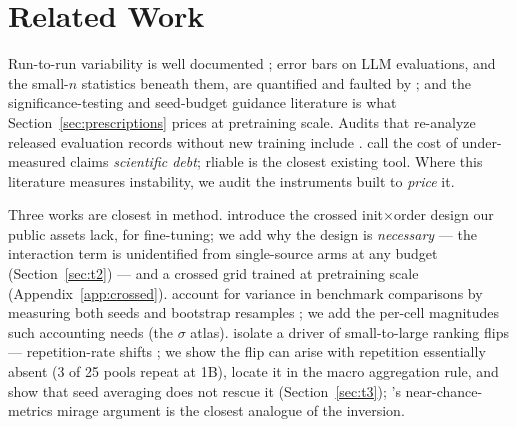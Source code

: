 \section{Related Work}
\label{sec:related}

Run-to-run variability is well documented \citep{nondeterminism2021, latentstate2023,
picard2021seed, henderson2018matters, reimers2017reporting, bouthillier2019unreproducible};
error bars on LLM
evaluations, and the small-$n$ statistics beneath them, are quantified and faulted by
\citet{miller2024errorbars, madaan2024variance, bowyer2025clt}; and the significance-testing
and seed-budget guidance literature \citep{dror2018hitchhiker, dodge2019showyourwork,
colas2018howmany} is what Section~\ref{sec:prescriptions} prices at pretraining scale.
Audits that re-analyze released evaluation records without new training include
\citet{roelofs2019metaanalysis, mathur2020tangled, card2020littlepower,
polo2024tinybenchmarks, besiroglu2024chinchilla}.
\citet{nityasya2023debt} call the cost of
under-measured claims \emph{scientific debt}; rliable \citep{agarwal2021rliable} is the closest existing
tool. Where this literature measures instability, we audit the
instruments built to \emph{price} it.

Three works are closest in method. \citet{dodge2020finetuning} introduce the crossed
init$\times$order design our public assets lack, for fine-tuning; we add why the design is
\emph{necessary} --- the interaction term is unidentified from single-source arms at any
budget (Section~\ref{sec:t2}) --- and a crossed grid trained at pretraining scale
(Appendix~\ref{app:crossed}). \citet{bouthillier2021variance} account for variance in
benchmark comparisons by measuring both seeds and bootstrap resamples
\citep{dehghani2021lottery}; we add the per-cell magnitudes such accounting needs (the
$\sigma$ atlas). \citet{zhou2026repetition} isolate a driver of
small-to-large ranking flips --- repetition-rate shifts \citep{muennighoff2023scaling}; we show the
flip can arise with repetition essentially absent (3 of 25 pools repeat at 1B), locate it in
the macro aggregation rule, and show that seed averaging does
not rescue it (Section~\ref{sec:t3}); \citet{schaeffer2023mirage}'s near-chance-metrics
mirage argument is the closest analogue of the inversion.

